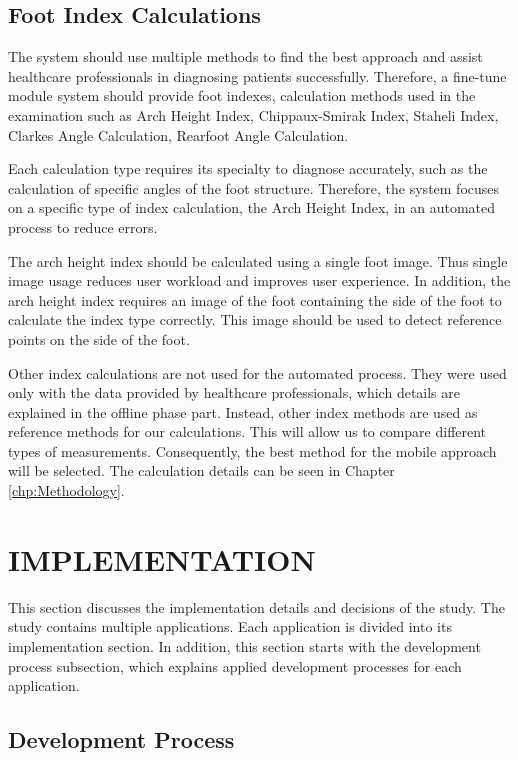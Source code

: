 \subsection{ Foot Index Calculations }

The system should use multiple methods to find the best approach and assist healthcare professionals in diagnosing patients successfully. Therefore, a fine-tune module system should provide foot indexes, calculation methods used in the examination such as Arch Height Index, Chippaux-Smirak Index, Staheli Index, Clarkes Angle Calculation, Rearfoot Angle Calculation. 

Each calculation type requires its specialty to diagnose accurately, such as the calculation of specific angles of the foot structure. Therefore, the system focuses on a specific type of index calculation, the Arch Height Index, in an automated process to reduce errors.

The arch height index should be calculated using a single foot image. Thus single image usage reduces user workload and improves user experience. In addition, the arch height index requires an image of the foot containing the side of the foot to calculate the index type correctly. This image should be used to detect reference points on the side of the foot. 

Other index calculations are not used for the automated process. They were used only with the data provided by healthcare professionals, which details are explained in the offline phase part. Instead, other index methods are used as reference methods for our calculations. This will allow us to compare different types of measurements. Consequently, the best method for the mobile approach will be selected. The calculation details can be seen in Chapter \ref{chp:Methodology}.

\section{IMPLEMENTATION}\label{sec:StudyIImplementation}

This section discusses the implementation details and decisions of the study. The study contains multiple applications. Each application is divided into its implementation section. In addition, this section starts with the development process subsection, which explains applied development processes for each application.

\subsection{Development Process}

